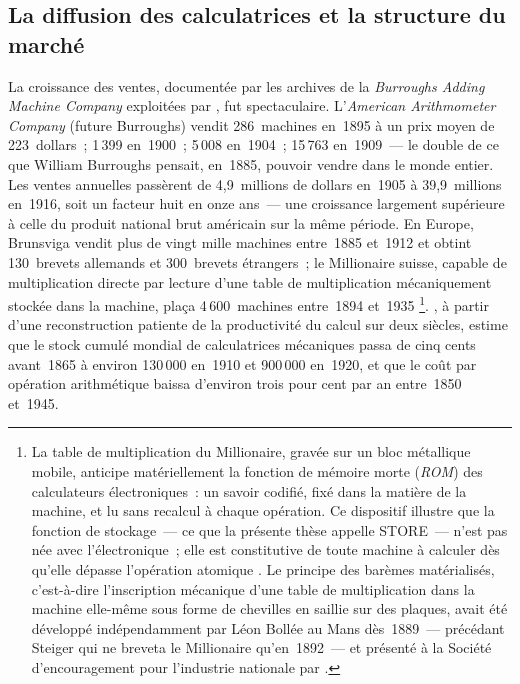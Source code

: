 \subsection{La diffusion des calculatrices et la structure du marché}\label{subsec:burroughs}

La croissance des ventes, documentée par les archives de la \emph{Burroughs Adding Machine Company} exploitées par \textcite{cortada_before_1993}, fut spectaculaire. L'\emph{American Arithmometer Company} (future Burroughs) vendit 286~machines en~1895 à un prix moyen de 223~dollars~; 1\,399 en~1900~; 5\,008 en~1904~; 15\,763 en~1909~--- le double de ce que William Burroughs pensait, en~1885, pouvoir vendre dans le monde entier. Les ventes annuelles passèrent de 4,9~millions de dollars en~1905 à 39,9~millions en~1916, soit un facteur huit en onze ans~--- une croissance largement supérieure à celle du produit national brut américain sur la même période. En Europe, Brunsviga vendit plus de vingt mille machines entre~1885 et~1912 et obtint 130~brevets allemands et 300~brevets étrangers~; le Millionaire suisse, capable de multiplication directe par lecture d'une table de multiplication mécaniquement stockée dans la machine, plaça 4\,600~machines entre~1894 et~1935 \parencite{cortada_before_1993}\footnote{La table de multiplication du Millionaire, gravée sur un bloc métallique mobile, anticipe matériellement la fonction de mémoire morte (\emph{ROM}) des calculateurs électroniques~: un savoir codifié, fixé dans la matière de la machine, et lu sans recalcul à chaque opération. Ce dispositif illustre que la fonction de stockage~--- ce que la présente thèse appelle STORE~--- n'est pas née avec l'électronique~; elle est constitutive de toute machine à calculer dès qu'elle dépasse l'opération atomique \parencite[ch.~8]{winston_media_1998}. Le principe des \og barèmes matérialisés\fg{}, c'est-à-dire l'inscription mécanique d'une table de multiplication dans la machine elle-même sous forme de chevilles en saillie sur des plaques, avait été développé indépendamment par Léon Bollée au Mans dès~1889~--- précédant Steiger qui ne breveta le Millionaire qu'en~1892~--- et présenté à la Société d'encouragement pour l'industrie nationale par \textcite{sebert_bollee_1890}.}. \textcite{nordhaus_two_2007}, à partir d'une reconstruction patiente de la productivité du calcul sur deux siècles, estime que le stock cumulé mondial de calculatrices mécaniques passa de cinq cents avant~1865 à environ 130\,000 en~1910 et 900\,000 en~1920, et que le coût par opération arithmétique baissa d'environ trois pour cent par an entre~1850 et~1945.

